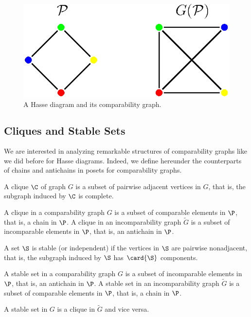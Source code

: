 \begin{figure}
\centering
\includegraphics[height=0.15\textheight]{fig/comp-graph}
\caption{\label{fig:comp-graph} A Hasse diagram and its comparability graph.}
\end{figure}




\subsection{Cliques and Stable Sets}

We are interested in analyzing remarkable structures of comparability graphs
like we did before for Hasse diagrams. Indeed, we define hereunder the
counterparts of chains and antichains in posets for comparability graphs.

\begin{definition}[Clique]
A clique $\C$ of graph $G$ is a subset of pairwise adjacent vertices in $G$,
that is, the subgraph induced by $\C$ is complete.
\end{definition}
A clique in a comparability graph ${G}$ is a subset of comparable elements in
$\P$, that is, a chain in $\P$.
A clique in an incomparability graph $\widetilde{G}$ is a subset of
incomparable  elements in $\P$, that is, an antichain in $\P$.

\begin{definition}
A set $\S$ is stable (or independent) if the vertices in $\S$ are pairwise
nonadjacent, that is, the subgraph induced by $\S$ has $\card{\S}$ components.
\end{definition}
A stable set in a comparability graph ${G}$ is a subset of incomparable
elements in $\P$, that is, an antichain in $\P$.
A stable set in an incomparability graph $\widetilde{G}$ is a subset of
comparable elements in $\P$, that is, a chain in $\P$.


A stable set in ${G}$ is a clique in $\widetilde{G}$ and vice versa.



